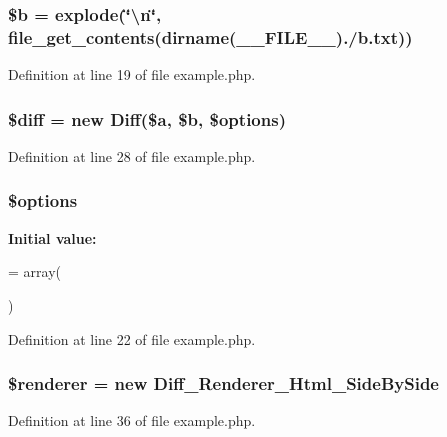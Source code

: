 \subsubsection[{\$b}]{\setlength{\rightskip}{0pt plus 5cm}\${\bf b} = explode(\char`\"{}\textbackslash{}n\char`\"{}, file\+\_\+get\+\_\+contents(dirname(\+\_\+\+\_\+\+F\+I\+L\+E\+\_\+\+\_\+).\textquotesingle{}/b.\+txt\textquotesingle{}))}\label{phpspec_2php-diff_2example_2example_8php_ab9eb087b791749ae45deabb0899b7ccc}


Definition at line 19 of file example.\+php.

\subsubsection[{\$diff}]{\setlength{\rightskip}{0pt plus 5cm}\$diff = new {\bf Diff}(\${\bf a}, \${\bf b}, \${\bf options})}\label{phpspec_2php-diff_2example_2example_8php_a054557295caacf1b6e4a2b8809418221}


Definition at line 28 of file example.\+php.

\subsubsection[{\$options}]{\setlength{\rightskip}{0pt plus 5cm}\${\bf options}}\label{phpspec_2php-diff_2example_2example_8php_a011800c63ece4cbbfa77136a20607023}
{\bfseries Initial value\+:}
\begin{DoxyCode}
= array(
            
            
        )
\end{DoxyCode}


Definition at line 22 of file example.\+php.

\subsubsection[{\$renderer}]{\setlength{\rightskip}{0pt plus 5cm}\$renderer = new {\bf Diff\+\_\+\+Renderer\+\_\+\+Html\+\_\+\+Side\+By\+Side}}\label{phpspec_2php-diff_2example_2example_8php_a8d061cd61ab0c71fbad5286ee0928a24}


Definition at line 36 of file example.\+php.


